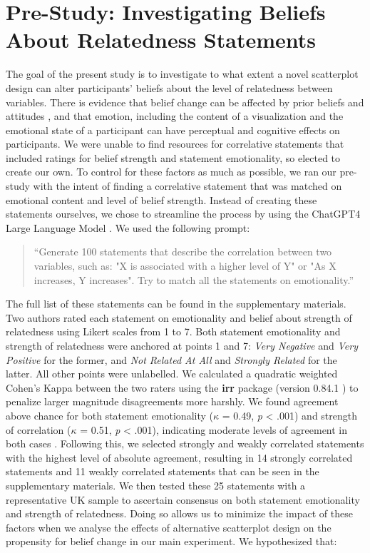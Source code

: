 \documentclass[manuscript,screen,review,anonymous]{acmart}
\begin{document}
\section{Pre-Study: Investigating Beliefs About Relatedness
Statements}\label{sec-pre-study}

The goal of the present study is to investigate to what extent a novel
scatterplot design can alter participants' beliefs about the level of
relatedness between variables. There is evidence that belief change can
be affected by prior beliefs and attitudes
\citep{xiong_2022, markant_2023}, and that emotion, including the
content of a visualization \citep{phelps_2006, harrison_2013} and the
emotional state of a participant \citep{thoresen_2016} can have
perceptual and cognitive effects on participants. We were unable to find
resources for correlative statements that included ratings for belief
strength and statement emotionality, so elected to create our own. To
control for these factors as much as possible, we ran our pre-study with
the intent of finding a correlative statement that was matched on
emotional content and level of belief strength. Instead of creating
these statements ourselves, we chose to streamline the process by using
the ChatGPT4 Large Language Model \citep{chat_gpt}. We used the
following prompt:

\begin{quotation}
    ``Generate 100 statements that describe the correlation between two variables, such as:
     "X is associated with a higher level of Y" or
     "As X increases, Y increases".
    Try to match all the statements on emotionality.''
    
\end{quotation}

The full list of these statements can be found in the supplementary
materials. Two authors rated each statement on emotionality and belief
about strength of relatedness using Likert scales from 1 to 7. Both
statement emotionality and strength of relatedness were anchored at
points 1 and 7: \emph{Very Negative} and \emph{Very Positive} for the
former, and \emph{Not Related At All} and \emph{Strongly Related} for
the latter. All other points were unlabelled. We calculated a quadratic
weighted Cohen's Kappa between the two raters using the \textbf{irr}
package (version 0.84.1 \citep{irr}) to penalize larger magnitude
disagreements more harshly. We found agreement above chance for both
statement emotionality (\(\kappa\) = 0.49, \emph{p} \textless{} .001)
and strength of correlation (\(\kappa\) = 0.51, \emph{p} \textless{}
.001), indicating moderate levels of agreement in both cases
\citep{cohen_1968, fleiss_1969}. Following this, we selected strongly
and weakly correlated statements with the highest level of absolute
agreement, resulting in 14 strongly correlated statements and 11 weakly
correlated statements that can be seen in the supplementary materials.
We then tested these 25 statements with a representative UK sample to
ascertain consensus on both statement emotionality and strength of
relatedness. Doing so allows us to minimize the impact of these factors
when we analyse the effects of alternative scatterplot design on the
propensity for belief change in our main experiment. We hypothesized
that:
\end{document}
